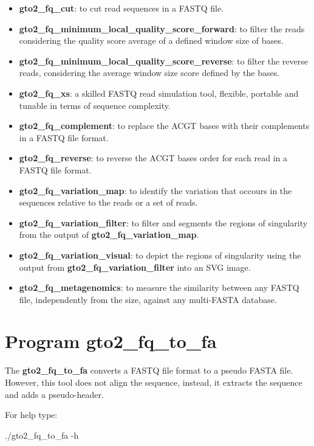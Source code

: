 \documentclass[11pt,]{krantz}
\newenvironment{Shaded}{\begin{snugshade}}{\end{snugshade}}
\newcommand{\ExtensionTok}[1]{#1}
\newcommand{\NormalTok}[1]{#1}
\begin{document}
\begin{itemize}
\item
  \textbf{gto2\_fq\_cut}: to cut read sequences in a FASTQ file.
\item
  \textbf{gto2\_fq\_minimum\_local\_quality\_score\_forward}: to filter
  the reads considering the quality score average of a defined window
  size of bases.
\item
  \textbf{gto2\_fq\_minimum\_local\_quality\_score\_reverse}: to filter
  the reverse reads, considering the average window size score defined
  by the bases.
\item
  \textbf{gto2\_fq\_xs}: a skilled FASTQ read simulation tool, flexible,
  portable and tunable in terms of sequence complexity.
\item
  \textbf{gto2\_fq\_complement}: to replace the ACGT bases with their
  complements in a FASTQ file format.
\item
  \textbf{gto2\_fq\_reverse}: to reverse the ACGT bases order for each
  read in a FASTQ file format.
\item
  \textbf{gto2\_fq\_variation\_map}: to identify the variation that
  occours in the sequences relative to the reads or a set of reads.
\item
  \textbf{gto2\_fq\_variation\_filter}: to filter and segments the
  regions of singularity from the output of
  \textbf{gto2\_fq\_variation\_map}.
\item
  \textbf{gto2\_fq\_variation\_visual}: to depict the regions of
  singularity using the output from \textbf{gto2\_fq\_variation\_filter}
  into an SVG image.
\item
  \textbf{gto2\_fq\_metagenomics}: to measure the similarity between any
  FASTQ file, independently from the size, against any multi-FASTA
  database.
\end{itemize}

\section{Program gto2\_fq\_to\_fa}\label{program-gto2_fq_to_fa}

The \textbf{gto2\_fq\_to\_fa} converts a FASTQ file format to a pseudo
FASTA file. However, this tool does not align the sequence, instead, it
extracts the sequence and adds a pseudo-header.

For help type:

\begin{Shaded}
\begin{Highlighting}[]
\ExtensionTok{./gto2_fq_to_fa}\NormalTok{ -h}
\end{Highlighting}
\end{Shaded}
\end{document}
